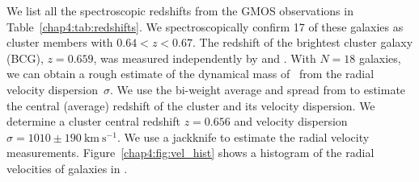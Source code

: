 We list all the spectroscopic redshifts from the GMOS observations in Table~\ref{chap4:tab:redshifts}. We spectroscopically confirm 17 of these galaxies as cluster members with $0.64<z<0.67$. The redshift of the brightest cluster galaxy (BCG), $z=0.659$, was measured independently by \citet{Oguri:2012bs} and \citet{Stark:2013kl}. With $N=18$ galaxies, we can obtain a rough estimate of the dynamical mass of \cluster\ from the radial velocity dispersion~$\sigma$. We use the bi-weight average and spread from \citep{Beers:1990rt} to estimate the central (average) redshift of the cluster and its velocity dispersion. We determine a cluster central redshift $z=0.656$ and velocity dispersion $\sigma=1010\pm190\ \mathrm{km\ s^{-1}}$. We use a jackknife to estimate the radial velocity measurements. Figure~\ref{chap4:fig:vel_hist} shows a histogram of the radial velocities of galaxies in \cluster.


